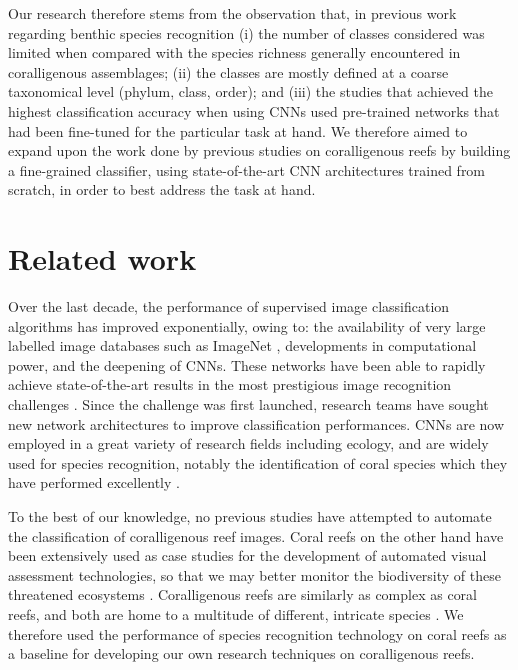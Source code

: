 Our research therefore stems from the observation that, in previous work regarding benthic species recognition (i) the number of classes considered was limited when compared with the species richness generally encountered in coralligenous assemblages; (ii) the classes are mostly defined at a coarse taxonomical level (phylum, class, order); and (iii) the studies that achieved the highest classification accuracy when using CNNs used pre-trained networks that had been fine-tuned for the particular task at hand. We therefore aimed to expand upon the work done by previous studies on coralligenous reefs by building a fine-grained classifier, using state-of-the-art CNN architectures trained from scratch, in order to best address the task at hand.

\section{Related work}\label{chapitre1_2}
Over the last decade, the performance of supervised image classification algorithms has improved exponentially, owing to: the availability of very large labelled image databases such as ImageNet \citep{deng_imagenet:_2009}, developments in computational power, and the deepening of CNNs. These networks have been able to rapidly achieve state-of-the-art results in the most prestigious image recognition challenges \citep{russakovsky_imagenet_2015}. Since the challenge was first launched, research teams have sought new network architectures to improve classification performances. CNNs are now employed in a great variety of research fields including ecology, and are widely used for species recognition, notably the identification of coral species which they have performed excellently \citep{king_comparison_2018}.

To the best of our knowledge, no previous studies have attempted to automate the classification of coralligenous reef images. Coral reefs on the other hand have been extensively used as case studies for the development of automated visual assessment technologies, so that we may better monitor the biodiversity of these threatened ecosystems \citep{beijbom_automated_2012, beijbom_towards_2015, king_comparison_2018, mahmood_coral_2016, manderson_robotic_2017}. Coralligenous reefs are similarly as complex as coral reefs, and both are home to a multitude of different, intricate species \citep{bianchi_biocostruzione_2001}. We therefore used the performance of species recognition technology on coral reefs as a baseline for developing our own research techniques on coralligenous reefs.

